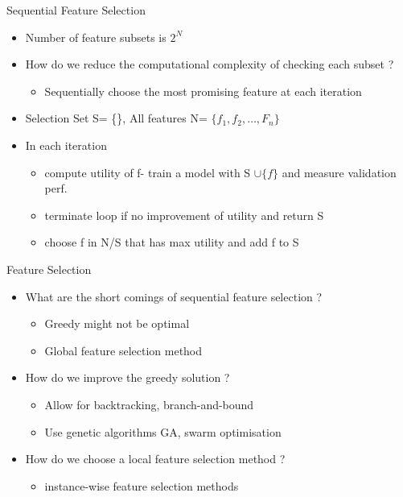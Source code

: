 \documentclass[11pt,compress,t,notes=noshow, aspectratio=169, xcolor=table]{beamer}
\begin{document}
\begin{frame}{Sequential Feature Selection}
\begin{itemize}
    \item Number of feature subsets is $2^N$
    \item How do we reduce the computational complexity of checking each subset ?
    \begin{itemize}
        \item Sequentially choose the most promising feature at each iteration
    \end{itemize}
    \bigskip
    \item Selection Set S= \{\}, All features N= $\{f_1,f_2, \dots , F_n\}$
    \item In each iteration
    \begin{itemize}
        \item compute utility of f- train a model with S $\cup\{f\}$ and measure validation perf.
        \item terminate loop if no improvement of utility and return S
        \item choose f in N/S that has max utility and add f to S
    \end{itemize}
\end{itemize}
    
\end{frame}
\begin{frame}{Feature Selection}
\begin{itemize}
    \item What are the short comings of sequential feature selection ?
    \begin{itemize}
        \item Greedy might not be optimal
        \item Global feature selection method
    \end{itemize}
    \bigskip
    \item How do we improve the greedy solution ?
     \begin{itemize}
        \item Allow for backtracking, branch-and-bound
        \item Use genetic algorithms GA, swarm optimisation
    \end{itemize}
    \bigskip
    \item How do we choose a local feature selection method ?
    \begin{itemize}
        \item instance-wise feature selection methods
    \end{itemize}
\end{itemize}
    
\end{frame}

\endlecture
\end{document}
